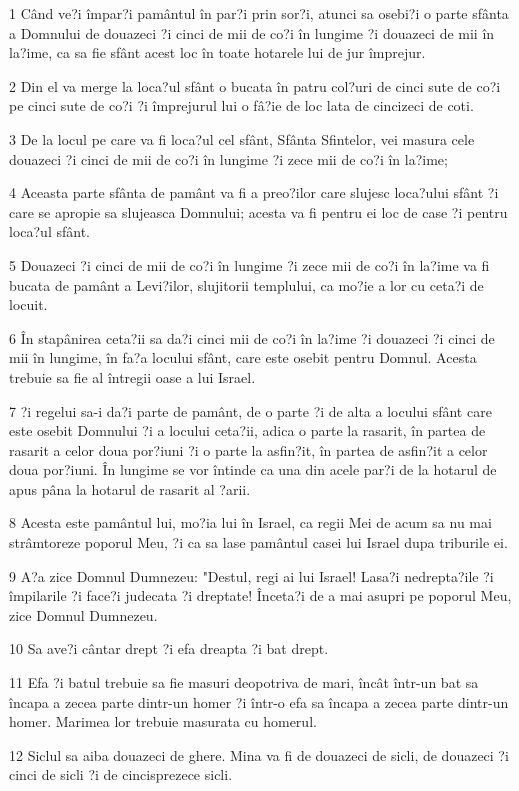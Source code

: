 \par 1 Când ve?i împar?i pamântul în par?i prin sor?i, atunci sa osebi?i o parte sfânta a Domnului de douazeci ?i cinci de mii de co?i în lungime ?i douazeci de mii în la?ime, ca sa fie sfânt acest loc în toate hotarele lui de jur împrejur.
\par 2 Din el va merge la loca?ul sfânt o bucata în patru col?uri de cinci sute de co?i pe cinci sute de co?i ?i împrejurul lui o fâ?ie de loc lata de cincizeci de coti.
\par 3 De la locul pe care va fi loca?ul cel sfânt, Sfânta Sfintelor, vei masura cele douazeci ?i cinci de mii de co?i în lungime ?i zece mii de co?i în la?ime;
\par 4 Aceasta parte sfânta de pamânt va fi a preo?ilor care slujesc loca?ului sfânt ?i care se apropie sa slujeasca Domnului; acesta va fi pentru ei loc de case ?i pentru loca?ul sfânt.
\par 5 Douazeci ?i cinci de mii de co?i în lungime ?i zece mii de co?i în la?ime va fi bucata de pamânt a Levi?ilor, slujitorii templului, ca mo?ie a lor cu ceta?i de locuit.
\par 6 În stapânirea ceta?ii sa da?i cinci mii de co?i în la?ime ?i douazeci ?i cinci de mii în lungime, în fa?a locului sfânt, care este osebit pentru Domnul. Acesta trebuie sa fie al întregii oase a lui Israel.
\par 7 ?i regelui sa-i da?i parte de pamânt, de o parte ?i de alta a locului sfânt care este osebit Domnului ?i a locului ceta?ii, adica o parte la rasarit, în partea de rasarit a celor doua por?iuni ?i o parte la asfin?it, în partea de asfin?it a celor doua por?iuni. În lungime se vor întinde ca una din acele par?i de la hotarul de apus pâna la hotarul de rasarit al ?arii.
\par 8 Acesta este pamântul lui, mo?ia lui în Israel, ca regii Mei de acum sa nu mai strâmtoreze poporul Meu, ?i ca sa lase pamântul casei lui Israel dupa triburile ei.
\par 9 A?a zice Domnul Dumnezeu: "Destul, regi ai lui Israel! Lasa?i nedrepta?ile ?i împilarile ?i face?i judecata ?i dreptate! Înceta?i de a mai asupri pe poporul Meu, zice Domnul Dumnezeu.
\par 10 Sa ave?i cântar drept ?i efa dreapta ?i bat drept.
\par 11 Efa ?i batul trebuie sa fie masuri deopotriva de mari, încât într-un bat sa încapa a zecea parte dintr-un homer ?i într-o efa sa încapa a zecea parte dintr-un homer. Marimea lor trebuie masurata cu homerul.
\par 12 Siclul sa aiba douazeci de ghere. Mina va fi de douazeci de sicli, de douazeci ?i cinci de sicli ?i de cincisprezece sicli.

